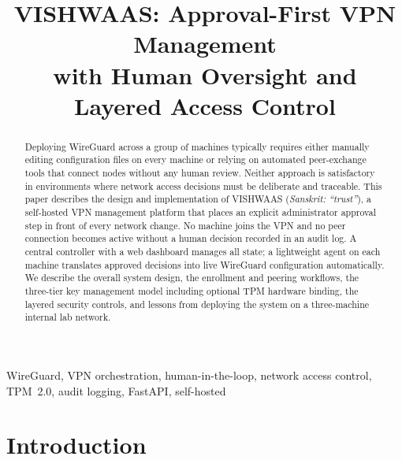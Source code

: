 \documentclass[conference]{IEEEtran}
\begin{document}
\title{VISHWAAS: Approval-First VPN Management\\with Human Oversight and Layered Access Control}

\author{
}

\maketitle

\begin{abstract}
Deploying WireGuard across a group of machines typically requires
either manually editing configuration files on every machine or
relying on automated peer-exchange tools that connect nodes without
any human review. Neither approach is satisfactory in environments
where network access decisions must be deliberate and traceable.
This paper describes the design and implementation of VISHWAAS
(\textit{Sanskrit: ``trust''}), a self-hosted VPN management platform
that places an explicit administrator approval step in front of every
network change. No machine joins the VPN and no peer connection
becomes active without a human decision recorded in an audit log.
A central controller with a web dashboard manages all state; a
lightweight agent on each machine translates approved decisions
into live WireGuard configuration automatically. We describe the
overall system design, the enrollment and peering workflows, the
three-tier key management model including optional TPM hardware
binding, the layered security controls, and lessons from deploying
the system on a three-machine internal lab network.
\end{abstract}

\begin{IEEEkeywords}
WireGuard, VPN orchestration, human-in-the-loop, network access control,
TPM~2.0, audit logging, FastAPI, self-hosted
\end{IEEEkeywords}


\section{Introduction}
\end{document}
